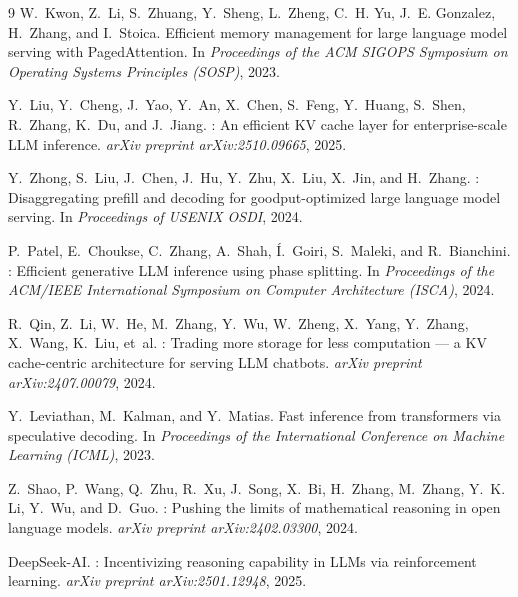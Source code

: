 \documentclass{article}
\begin{document}
\begin{thebibliography}{9}
W.~Kwon, Z.~Li, S.~Zhuang, Y.~Sheng, L.~Zheng, C.~H. Yu, J.~E. Gonzalez,
H.~Zhang, and I.~Stoica.
\newblock Efficient memory management for large language model serving with
  {PagedAttention}.
\newblock In \emph{Proceedings of the ACM SIGOPS Symposium on Operating Systems
  Principles (SOSP)}, 2023.

Y.~Liu, Y.~Cheng, J.~Yao, Y.~An, X.~Chen, S.~Feng, Y.~Huang, S.~Shen,
R.~Zhang, K.~Du, and J.~Jiang.
: An efficient {KV} cache layer for enterprise-scale {LLM}
  inference.
\newblock \emph{arXiv preprint arXiv:2510.09665}, 2025.

Y.~Zhong, S.~Liu, J.~Chen, J.~Hu, Y.~Zhu, X.~Liu, X.~Jin, and H.~Zhang.
: Disaggregating prefill and decoding for
  goodput-optimized large language model serving.
\newblock In \emph{Proceedings of USENIX OSDI}, 2024.

P.~Patel, E.~Choukse, C.~Zhang, A.~Shah, {\'I}.~Goiri, S.~Maleki, and
R.~Bianchini.
: Efficient generative {LLM} inference using phase
  splitting.
\newblock In \emph{Proceedings of the ACM/IEEE International Symposium on
  Computer Architecture (ISCA)}, 2024.

R.~Qin, Z.~Li, W.~He, M.~Zhang, Y.~Wu, W.~Zheng, X.~Yang, Y.~Zhang,
X.~Wang, K.~Liu, et~al.
: Trading more storage for less computation --- a {KV}
  cache-centric architecture for serving {LLM} chatbots.
\newblock \emph{arXiv preprint arXiv:2407.00079}, 2024.

Y.~Leviathan, M.~Kalman, and Y.~Matias.
\newblock Fast inference from transformers via speculative decoding.
\newblock In \emph{Proceedings of the International Conference on Machine
  Learning (ICML)}, 2023.

Z.~Shao, P.~Wang, Q.~Zhu, R.~Xu, J.~Song, X.~Bi, H.~Zhang, M.~Zhang,
Y.~K. Li, Y.~Wu, and D.~Guo.
: Pushing the limits of mathematical reasoning in open
  language models.
\newblock \emph{arXiv preprint arXiv:2402.03300}, 2024.

{DeepSeek-AI}.
: Incentivizing reasoning capability in {LLMs} via
  reinforcement learning.
\newblock \emph{arXiv preprint arXiv:2501.12948}, 2025.

\end{thebibliography}
\end{document}

